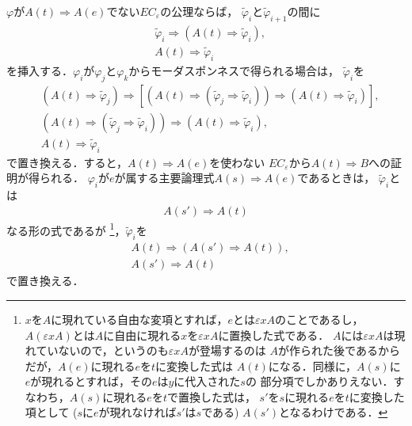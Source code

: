 	
	$\varphi$が$A(t) \Longrightarrow A(e)$でない$EC_{\varepsilon}$の公理ならば，
	$\tilde{\varphi}_{i}$と$\tilde{\varphi}_{i+1}$の間に
	\begin{align}
		&\tilde{\varphi}_{i} \Longrightarrow 
		\left( A(t) \Longrightarrow \tilde{\varphi}_{i} \right), \\
		&A(t) \Longrightarrow \tilde{\varphi}_{i}
	\end{align}
	を挿入する．$\varphi_{i}$が$\varphi_{j}$と$\varphi_{k}$からモーダスポンネスで得られる場合は，
	$\tilde{\varphi}_{i}$を
	\begin{align}
		&\left( A(t) \Longrightarrow \tilde{\varphi}_{j} \right)
		\Longrightarrow \left[ \left( A(t) \Longrightarrow 
		\left( \tilde{\varphi}_{j}\Longrightarrow \tilde{\varphi}_{i} \right) \right)
		\Longrightarrow \left( A(t) \Longrightarrow \tilde{\varphi}_{i} \right) \right], \\
		&\left( A(t) \Longrightarrow 
		\left( \tilde{\varphi}_{j}\Longrightarrow \tilde{\varphi}_{i} \right) \right)
		\Longrightarrow \left( A(t) \Longrightarrow \tilde{\varphi}_{i} \right), \\
		&A(t) \Longrightarrow \tilde{\varphi}_{i}
	\end{align}
	で置き換える．すると，$A(t) \Longrightarrow A(e)$を使わない
	$EC_{\varepsilon}$から$A(t) \Longrightarrow B$への証明が得られる．
	$\varphi_{i}$が$e$が属する主要論理式$A(s) \Longrightarrow A(e)$であるときは，
	$\tilde{\varphi}_{i}$とは
	\begin{align}
		A(s') \Longrightarrow A(t)
	\end{align}
	なる形の式であるが
	\footnote{
		$x$を$A$に現れている自由な変項とすれば，$e$とは$\varepsilon x A$のことであるし，
		$A(\varepsilon x A)$とは$A$に自由に現れる$x$を$\varepsilon x A$に置換した式である．
		$A$には$\varepsilon x A$は現れていないので，というのも$\varepsilon x A$が登場するのは
		$A$が作られた後であるからだが，$A(e)$に現れる$e$を$t$に変換した式は
		$A(t)$になる．同様に，$A(s)$に$e$が現れるとすれば，その$e$は$y$に代入された$s$の
		部分項でしかありえない．すなわち，$A(s)$に現れる$e$を$t$で置換した式は，
		$s'$を$s$に現れる$e$を$t$に変換した項として ($s$に$e$が現れなければ$s'$は$s$である)
		$A(s')$となるわけである．
	}，$\tilde{\varphi}_{i}$を
	\begin{align}
		&A(t) \Longrightarrow (A(s') \Longrightarrow A(t)), \\
		&A(s') \Longrightarrow A(t)
	\end{align}
	で置き換える．
	
